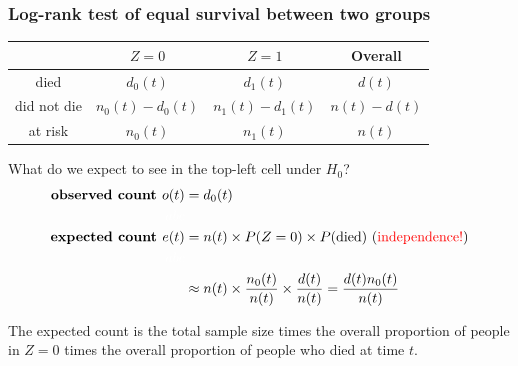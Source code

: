 \documentclass[10pt,t]{beamer}
\begin{document}
\begin{frame}
\frametitle{Log-rank test of equal survival between two groups}

\vspace{-7 mm}

\begin{center}
\begin{tabular}{c|c|c|c}
& $Z = 0$ & $Z = 1$ & Overall\\
\hline
died & $d_0(t)$ & $d_1(t)$ & $d(t)$ \\
did not die & $n_0(t) - d_0(t)$ & $n_1(t) - d_1(t)$ & $n(t) - d(t)$\\
at risk & $n_0(t)$ & $n_1(t)$ & $n(t)$
\end{tabular}
\end{center}

\medskip

What do we expect to see in the top-left cell under $H_0$?
\begin{align*}
\textbf{observed count } o(t) &= d_0(t) \\
\textcolor{white}{abc}\\
\textbf{expected count } e(t) &= n(t) \times P(Z = 0) \times P(\text{died}) \text{  (\textcolor{red}{independence!})}\\
\textcolor{white}{abc}\\
&\approx n(t)\times \frac{n_0(t)}{n(t)}\times  \frac{d(t)}{n(t)} = \frac{d(t)n_0(t)}{n(t)}
\end{align*}

\medskip

The expected count is the total sample size times the overall proportion of people in $Z=0$ times the overall proportion of people who died at time $t$.

\end{frame}
\end{document}
